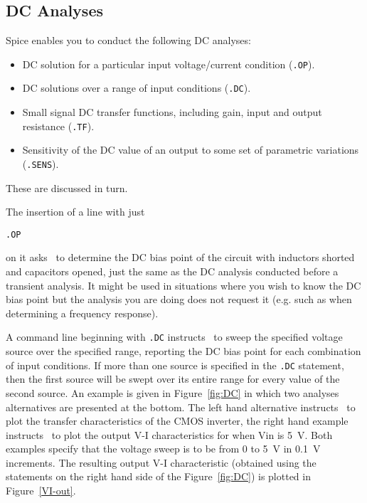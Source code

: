 \subsection{DC Analyses}
\label{DC}

Spice enables you to conduct the following DC analyses:
\begin{itemize}
  \item DC solution for a particular input voltage/current condition
    ({\tt .OP}).
  \item DC solutions over a range of input conditions ({\tt .DC}).
  \item Small signal DC transfer functions, including gain, input
    and output resistance ({\tt .TF}).
  \item Sensitivity of the DC value of an output to some set of
    parametric variations ({\tt .SENS}).
\end{itemize}
These are discussed in turn.

The insertion of a line with just
\begin{center}
{\tt .OP}
\end{center}
on it asks \spice\ to determine the DC bias point of the circuit with
inductors shorted and capacitors opened, just the same as the DC analysis
conducted before a transient analysis.  It might be used in situations
where you wish to know the DC bias point but the analysis you are
doing does not request it (e.g. such as when determining a frequency response).

A command line beginning with {\tt .DC} instructs \spice\ to sweep the specified
voltage source over the specified range, reporting the DC bias point
for each combination of input conditions.
If more than one source is specified
in the {\tt .DC} statement, then the first source will be swept over its
entire range for every value of the second source.
An example is given in Figure~\ref{fig:DC} in which two analyses alternatives
are presented at the bottom.
The left hand alternative instructs \spice\ to plot the transfer characteristics
of the CMOS inverter, the right hand
example instructs \spice\ to plot
the output V-I characteristics for when Vin is 5~V.
Both examples specify that the voltage sweep is to be from 0 to 5~V in
0.1~V increments.
The resulting output V-I characteristic (obtained using the statements
on the right hand side of the Figure~\ref{fig:DC}) is plotted in
Figure~\ref{VI-out}.

